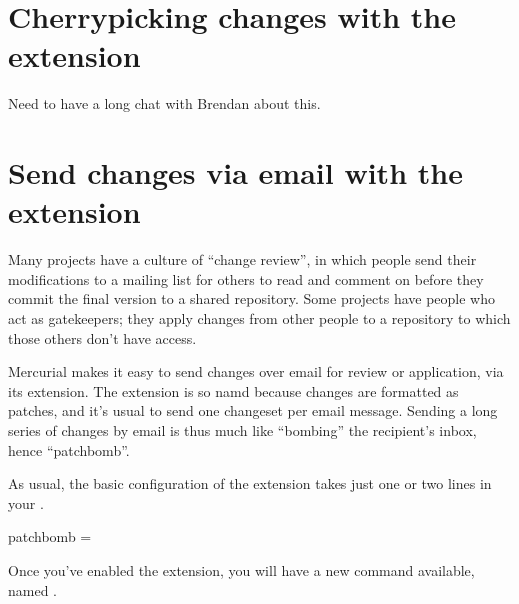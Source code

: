 \section{Cherrypicking changes with the  extension}
\label{sec:hgext:transplant}

Need to have a long chat with Brendan about this.

\section{Send changes via email with the  extension}
\label{sec:hgext:patchbomb}

Many projects have a culture of ``change review'', in which people
send their modifications to a mailing list for others to read and
comment on before they commit the final version to a shared
repository.  Some projects have people who act as gatekeepers; they
apply changes from other people to a repository to which those others
don't have access.

Mercurial makes it easy to send changes over email for review or
application, via its  extension.  The extension is so
namd because changes are formatted as patches, and it's usual to send
one changeset per email message.  Sending a long series of changes by
email is thus much like ``bombing'' the recipient's inbox, hence
``patchbomb''.

As usual, the basic configuration of the  extension
takes just one or two lines in your \hgrc.
\begin{codesample2}
  [extensions]
  patchbomb =
\end{codesample2}
Once you've enabled the extension, you will have a new command
available, named .


